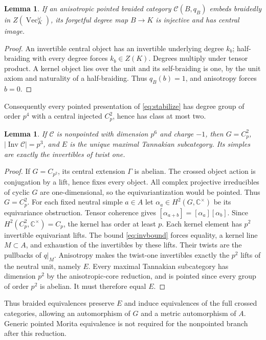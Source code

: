 \documentclass[11pt]{amsart}
\newtheorem{lemma}[theorem]{Lemma}
\theoremstyle{definition}\newtheorem{definition}[theorem]{Definition}
\newcommand{\C}{\mathbb C}
\renewcommand{\Vec}{\operatorname{Vec}}
\newcommand{\Inv}{\operatorname{Inv}}
\newcommand{\cC}{\mathcal C}
\begin{document}
\begin{lemma}\label{lem:flux}
If an anisotropic pointed braided category $\cC(B,q_B)$ embeds braidedly in
$Z(\Vec_K^\omega)$, its forgetful degree map $B\to K$ is injective and has
central image.
\end{lemma}
\begin{proof}
An invertible central object has an invertible underlying degree $k_b$;
half-braiding with every degree forces $k_b\in Z(K)$. Degrees multiply under
tensor product. A kernel object lies over the unit and its self-braiding is one,
by the unit axiom and naturality of a half-braiding. Thus $q_B(b)=1$, and
anisotropy forces $b=0$.
\end{proof}
Consequently every pointed presentation of \eqref{eq:stabilize} has degree
group of order $p^4$ with a central injected $C_p^2$, hence has class at most two.

\begin{lemma}\label{lem:canonical}
If $\cC$ is nonpointed with dimension $p^6$ and charge $-1$, then $G=C_p^2$,
$|\Inv\cC|=p^3$, and $E$ is the unique maximal Tannakian subcategory.
Its simples are exactly the invertibles of twist one.
\end{lemma}
\begin{proof}
If $G=C_{p^2}$, its central extension $\Gamma$ is abelian. The crossed object
action is conjugation by a lift, hence fixes every object. All complex projective
irreducibles of cyclic $G$ are one-dimensional, so the equivariantization would
be pointed. Thus $G=C_p^2$.
For each fixed neutral simple $a\in A$ let $\alpha_a\in H^2(G,\C^\times)$ be
its equivariance obstruction. Tensor coherence gives
$[\alpha_{a+b}]=[\alpha_a][\alpha_b]$. Since $H^2(C_p^2,\C^\times)=C_p$,
the kernel has order at least $p$. Each kernel element has $p^2$ invertible
equivariant lifts. The bound \eqref{eq:invbound} forces equality, a kernel line
$M\subset A$, and exhaustion of the invertibles by these lifts.
Their twists are the pullbacks of $q|_M$. Anisotropy makes the twist-one
invertibles exactly the $p^2$ lifts of the neutral unit, namely $E$.
Every maximal Tannakian subcategory has dimension $p^2$ by the anisotropic-core
reduction, and is pointed since every group of order $p^2$ is abelian. It must
therefore equal $E$.
\end{proof}
Thus braided equivalences preserve $E$ and induce equivalences of the full
crossed categories, allowing an automorphism of $G$ and a metric automorphism
of $A$. Generic pointed Morita equivalence is not required for the nonpointed
branch after this reduction.
\end{document}
